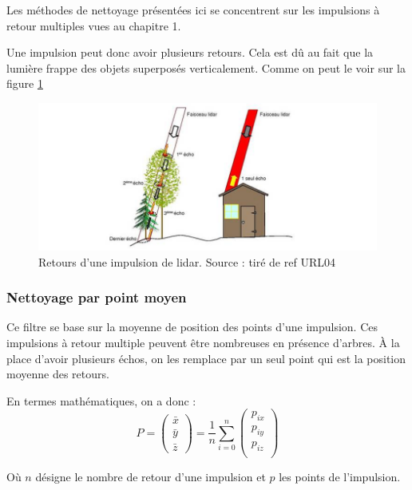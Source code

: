 Les méthodes de nettoyage présentées ici se concentrent sur les impulsions à retour
multiples vues au chapitre 1.

Une impulsion peut donc avoir plusieurs retours. Cela est dû au fait que la
lumière frappe des objets superposés verticalement. Comme on peut le voir sur 
la figure \ref{fig:lidar_echo}

\begin{figure}[htbp!]
    \centering
	\includegraphics[width=0.8\linewidth]{figures/lidar_echo.png}
	\caption{Retours d'une impulsion de lidar. Source : tiré de ref URL04}
	\label{fig:lidar_echo}
\end{figure}



\subsubsection{Nettoyage par point moyen}

Ce filtre se base sur la moyenne de position des points d'une impulsion.
Ces impulsions à retour multiple peuvent être nombreuses en présence d'arbres.
À la place d'avoir plusieurs échos, on les remplace par un seul point qui est la
position moyenne des retours.


En termes mathématiques, on a donc : 
$$
P = 
\begin{pmatrix}
    \bar{x} \\
    \bar{y} \\
    \bar{z}
\end{pmatrix}
=
\frac{1}{n}
\sum_{i=0}^{n}
\begin{pmatrix}
   p_{ix} \\
   p_{iy} \\
   p_{iz} \\
\end{pmatrix}
$$

Où $n$ désigne le nombre de retour d'une impulsion et $p$ les points de l'impulsion.



